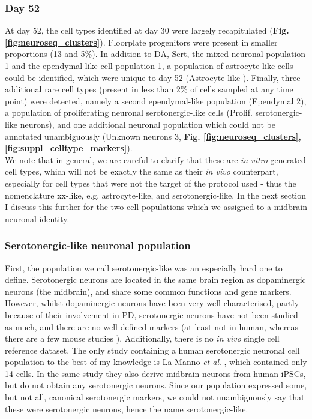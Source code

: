 \subsubsection{Day 52}

At day 52, the cell types identified at day 30 were largely recapitulated (\textbf{Fig. \ref{fig:neuroseq_clusters}}).
Floorplate progenitors were present in smaller proportions (13 and 5\%).
In addition to DA, Sert, the mixed neuronal population 1 and the ependymal-like cell population 1, a population of astrocyte-like cells could be identified, which were unique to day 52 (Astrocyte-like \cite{sloan2017human, zhang2016purification}). 
Finally, three additional rare cell types (present in less than 2\% of cells sampled at any time point) were detected, namely a second ependymal-like population (Ependymal 2), a population of proliferating neuronal serotonergic-like cells (Prolif. serotonergic-like neurons), and one additional neuronal population which could not be annotated unambiguously (Unknown neurons 3, \textbf{Fig. \ref{fig:neuroseq_clusters}, \ref{fig:suppl_celltype_markers}}). \\

We note that in general, we are careful to clarify that these are \textit{in vitro}-generated cell types, which will not be exactly the same as their \textit{in vivo} counterpart, especially for cell types that were not the target of the protocol used - thus the nomenclature xx-like, e.g. astrocyte-like, and serotonergic-like.
In the next section I discuss this further for the two cell populations which we assigned to a midbrain neuronal identity.

\subsubsection{Serotonergic-like neuronal population}

First, the population we call serotonergic-like was an especially hard one to define.
Serotonergic neurons are located in the same brain region as dopaminergic neurons 
(the midbrain),
and share some common functions and gene markers.
However, whilst dopaminergic neurons have been very well characterised, partly because of their involvement in PD, serotonergic neurons have not been studied as much, and there are no well defined markers (at least not in human, whereas there are a few mouse studies \cite{cummings2019serotonergic}).
Additionally, there is no \textit{in vivo} single cell reference dataset.
The only study containing a human serotonergic neuronal cell population to the best of my knowledge is La Manno \textit{et al}. \cite{la2016molecular}, which contained only 14 cells.
In the same study they also derive midbrain neurons from human iPSCs, but do not obtain any serotonergic neurons.
Since our population expressed some, but not all, canonical serotonergic markers, 
we could not unambiguously say that these were serotonergic neurons, hence the name serotonergic-like.

